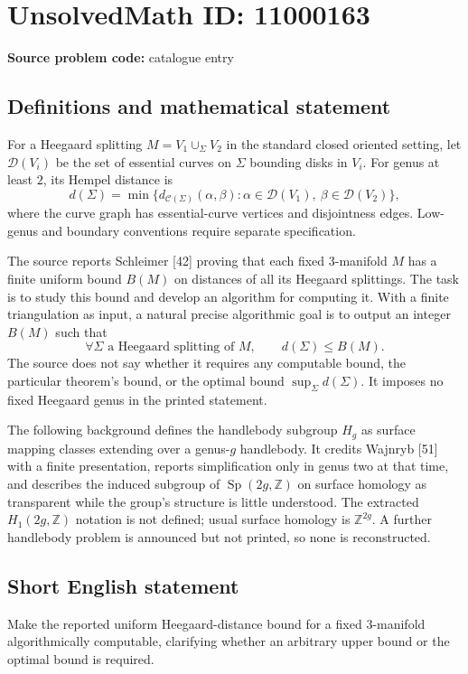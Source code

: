 \documentclass[11pt]{article}
\newcommand{\Z}{\mathbb{Z}}
\begin{document}
\section*{UnsolvedMath ID: 11000163}
\textbf{Source problem code:} catalogue entry
\subsection{Definitions and mathematical statement}
For a Heegaard splitting \(M=V_1\cup_\Sigma V_2\) in the standard closed oriented setting, let \(\mathcal D(V_i)\) be the set of essential curves on \(\Sigma\) bounding disks in \(V_i\). For genus at least \(2\), its Hempel distance is
\[
 d(\Sigma)=\min\{d_{\mathcal C(\Sigma)}(\alpha,\beta):
       \alpha\in\mathcal D(V_1),\ \beta\in\mathcal D(V_2)\},
\]
where the curve graph has essential-curve vertices and disjointness edges. Low-genus and boundary conventions require separate specification.

The source reports Schleimer [42] proving that each fixed \(3\)-manifold \(M\) has a finite uniform bound \(B(M)\) on distances of all its Heegaard splittings. The task is to study this bound and develop an algorithm for computing it. With a finite triangulation as input, a natural precise algorithmic goal is to output an integer \(B(M)\) such that
\[
 \forall\Sigma\text{ a Heegaard splitting of }M,\qquad d(\Sigma)\leq B(M).
\]
The source does not say whether it requires any computable bound, the particular theorem's bound, or the optimal bound \(\sup_\Sigma d(\Sigma)\). It imposes no fixed Heegaard genus in the printed statement.

The following background defines the handlebody subgroup \(H_g\) as surface mapping classes extending over a genus-\(g\) handlebody. It credits Wajnryb [51] with a finite presentation, reports simplification only in genus two at that time, and describes the induced subgroup of \(\operatorname{Sp}(2g,\Z)\) on surface homology as transparent while the group's structure is little understood. The extracted \(H_1(2g,\Z)\) notation is not defined; usual surface homology is \(\Z^{2g}\). A further handlebody problem is announced but not printed, so none is reconstructed.
\subsection{Short English statement}
Make the reported uniform Heegaard-distance bound for a fixed \(3\)-manifold algorithmically computable, clarifying whether an arbitrary upper bound or the optimal bound is required.
\end{document}
